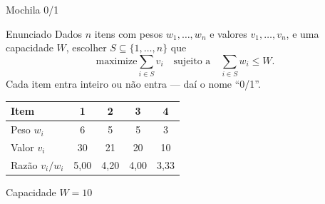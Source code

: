 \documentclass[aspectratio=169]{beamer}
\begin{document}
\begin{frame}{Mochila 0/1}
  \begin{block}{Enunciado}
    Dados $n$ itens com pesos $w_1,\ldots,w_n$ e valores $v_1,\ldots,v_n$, e uma
    capacidade $W$, escolher $S \subseteq \{1,\ldots,n\}$ que
    \[
      \text{maximize} \sum_{i \in S} v_i \quad \text{sujeito a} \quad \sum_{i \in S} w_i \le W .
    \]
    Cada item entra inteiro ou não entra --- daí o nome ``0/1''.
  \end{block}

  \begin{center}
  \small
  \begin{tabular}{@{}lcccc@{}}
    \toprule
    Item              & 1   & 2   & 3   & 4 \\
    \midrule
    Peso $w_i$        & 6   & 5   & 5   & 3 \\
    Valor $v_i$       & 30  & 21  & 20  & 10 \\
    Razão $v_i / w_i$ & 5{,}00 & 4{,}20 & 4{,}00 & 3{,}33 \\
    \bottomrule
  \end{tabular}
  \qquad Capacidade $W = 10$
  \end{center}
\end{frame}
\end{document}
